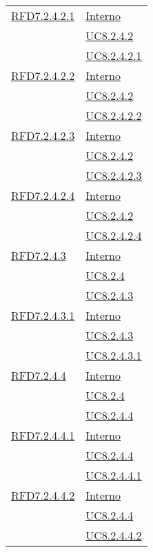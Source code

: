 \begin{longtable}{|>{\centering}m{5cm}|m{5cm}<{\centering}|}
\hyperlink{RFD7.2.4.2.1}{RFD7.2.4.2.1} & \hyperlink{Interno}{Interno}\\
& \hyperref[UC8.2.4.2]{UC8.2.4.2}\\
& \hyperref[UC8.2.4.2.1]{UC8.2.4.2.1}\\ \hline

\hyperlink{RFD7.2.4.2.2}{RFD7.2.4.2.2} & \hyperlink{Interno}{Interno}\\
& \hyperref[UC8.2.4.2]{UC8.2.4.2}\\
& \hyperref[UC8.2.4.2.2]{UC8.2.4.2.2}\\ \hline

\hyperlink{RFD7.2.4.2.3}{RFD7.2.4.2.3} & \hyperlink{Interno}{Interno}\\
& \hyperref[UC8.2.4.2]{UC8.2.4.2}\\
& \hyperref[UC8.2.4.2.3]{UC8.2.4.2.3}\\ \hline

\hyperlink{RFD7.2.4.2.4}{RFD7.2.4.2.4} & \hyperlink{Interno}{Interno}\\
& \hyperref[UC8.2.4.2]{UC8.2.4.2}\\
& \hyperref[UC8.2.4.2.4]{UC8.2.4.2.4}\\ \hline

\hyperlink{RFD7.2.4.3}{RFD7.2.4.3} & \hyperlink{Interno}{Interno}\\
& \hyperref[UC8.2.4]{UC8.2.4}\\
& \hyperref[UC8.2.4.3]{UC8.2.4.3}\\ \hline

\hyperlink{RFD7.2.4.3.1}{RFD7.2.4.3.1} & \hyperlink{Interno}{Interno}\\
& \hyperref[UC8.2.4.3]{UC8.2.4.3}\\
& \hyperref[UC8.2.4.3.1]{UC8.2.4.3.1}\\ \hline

\hyperlink{RFD7.2.4.4}{RFD7.2.4.4} & \hyperlink{Interno}{Interno}\\
& \hyperref[UC8.2.4]{UC8.2.4}\\
& \hyperref[UC8.2.4.4]{UC8.2.4.4}\\ \hline

\hyperlink{RFD7.2.4.4.1}{RFD7.2.4.4.1} & \hyperlink{Interno}{Interno}\\
& \hyperref[UC8.2.4.4]{UC8.2.4.4}\\
& \hyperref[UC8.2.4.4.1]{UC8.2.4.4.1}\\ \hline

\hyperlink{RFD7.2.4.4.2}{RFD7.2.4.4.2} & \hyperlink{Interno}{Interno}\\
& \hyperref[UC8.2.4.4]{UC8.2.4.4}\\
& \hyperref[UC8.2.4.4.2]{UC8.2.4.4.2}\\ \hline


\end{longtable}
